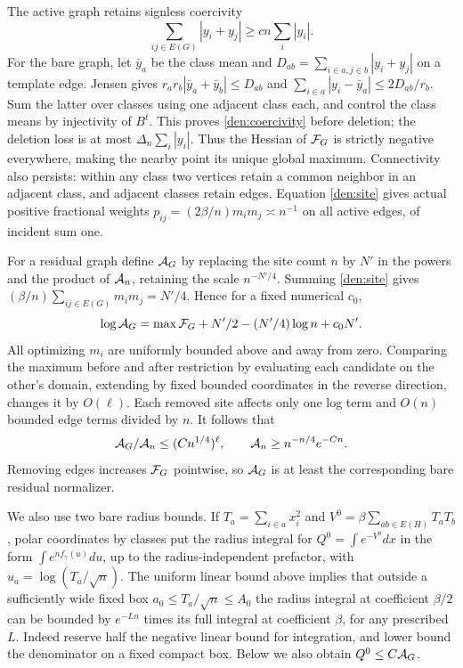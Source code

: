 The active graph retains signless coercivity
\begin{equation}\label{den:coercivity}
 \sum_{ij\in E(G)}|y_i+y_j|\ge c n\sum_i |y_i|.
\end{equation}
For the bare graph, let \(\bar y_a\) be the class mean and \(D_{ab}=\sum_{i\in a,j\in b}|y_i+y_j|\) on a template edge. Jensen gives \(r_ar_b|\bar y_a+\bar y_b|\le D_{ab}\) and
\(\sum_{i\in a}|y_i-\bar y_a|\le2D_{ab}/r_b\).
Sum the latter over classes using one adjacent class each, and control the class means by injectivity of \(B^t\). This proves \eqref{den:coercivity} before deletion; the deletion loss is at most \(\Delta_n\sum_i|y_i|\). Thus the Hessian of \({\cal F}_G\) is strictly negative everywhere, making the nearby point its unique global maximum. Connectivity also persists: within any class two vertices retain a common neighbor in an adjacent class, and adjacent classes retain edges. Equation \eqref{den:site} gives actual positive fractional weights \(p_{ij}=(2\beta/n)m_i m_j\asymp n^{-1}\) on all active edges, of incident sum one.

For a residual graph define \({\cal A}_G\) by replacing the site count \(n\) by \(N'\) in the powers and the product of \({\cal A}_n\), retaining the scale \(n^{-N'/4}\).
Summing \eqref{den:site} gives \((\beta/n)\sum_{ij\in E(G)}m_i m_j=N'/4\).
Hence for a fixed numerical \(c_0\),
\[
 \log{\cal A}_G=\max{\cal F}_G+N'/2-(N'/4)\log n+c_0N'.
\]
All optimizing \(m_i\) are uniformly bounded above and away from zero. Comparing the maximum before and after restriction by evaluating each candidate on the other's domain, extending by fixed bounded coordinates in the reverse direction, changes it by \(O(\ell)\). Each removed site affects only one log term and \(O(n)\) bounded edge terms divided by \(n\). It follows that
\begin{equation}\label{den:resratio}
 {\cal A}_{G}/{\cal A}_n\le(Cn^{1/4})^\ell,\qquad
 {\cal A}_n\ge n^{-n/4}e^{-Cn}.
\end{equation}
Removing edges increases \({\cal F}_G\) pointwise, so \({\cal A}_G\) is at least the corresponding bare residual normalizer.

We also use two bare radius bounds. If \(T_a=\sum_{i\in a}x_i^2\) and \(V^0=\beta\sum_{ab\in E(H)}T_aT_b\), polar coordinates by classes put the radius integral for \(Q^0=\int e^{-V^0}dx\) in the form \(\int e^{n f_\gamma(u)}du\), up to the radius-independent prefactor, with \(u_a=\log(T_a/\sqrt n)\). The uniform linear bound above implies that outside a sufficiently wide fixed box \(a_0\le T_a/\sqrt n\le A_0\) the radius integral at coefficient \(\beta/2\) can be bounded by \(e^{-Ln}\) times its full integral at coefficient \(\beta\), for any prescribed \(L\). Indeed reserve half the negative linear bound for integration, and lower bound the denominator on a fixed compact box. Below we also obtain \(Q^0\le C{\cal A}_G\).

